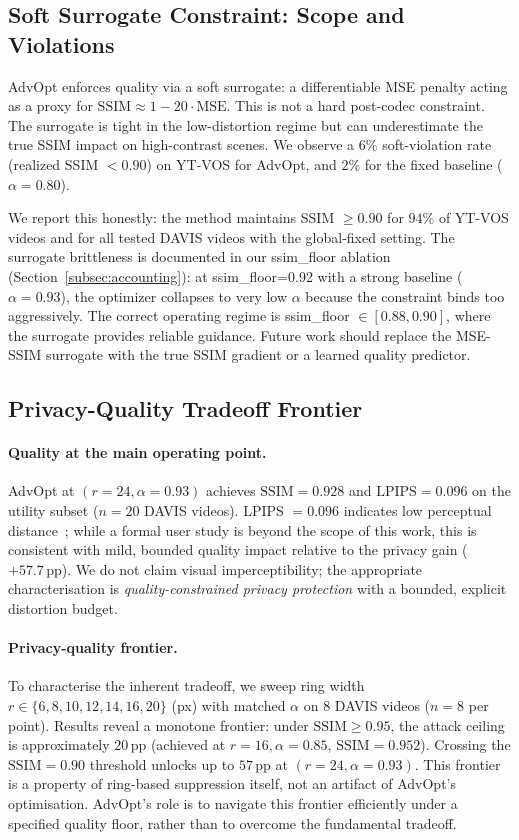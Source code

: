 \subsection{Soft Surrogate Constraint: Scope and Violations}

AdvOpt enforces quality via a soft surrogate: a differentiable MSE penalty acting as a proxy for $\mathrm{SSIM} \approx 1 - 20 \cdot \mathrm{MSE}$.
This is not a hard post-codec constraint. The surrogate is tight in the low-distortion regime but can underestimate the true SSIM impact on high-contrast scenes.
We observe a $6\%$ soft-violation rate (realized SSIM $< 0.90$) on YT-VOS for AdvOpt, and $2\%$ for the fixed baseline ($\alpha=0.80$).

We report this honestly: the method maintains SSIM $\geq 0.90$ for $94\%$ of YT-VOS videos and for all tested DAVIS videos with the global-fixed setting.
The surrogate brittleness is documented in our ssim\_floor ablation (Section~\ref{subsec:accounting}): at ssim\_floor=0.92 with a strong baseline ($\alpha=0.93$), the optimizer collapses to very low $\alpha$ because the constraint binds too aggressively.
The correct operating regime is ssim\_floor $\in [0.88, 0.90]$, where the surrogate provides reliable guidance.
Future work should replace the MSE-SSIM surrogate with the true SSIM gradient or a learned quality predictor.

\subsection{Privacy-Quality Tradeoff Frontier}

\paragraph{Quality at the main operating point.}
AdvOpt at $(r{=}24,\alpha{=}0.93)$ achieves $\mathrm{SSIM}{=}0.928$ and $\mathrm{LPIPS}{=}0.096$ on the utility subset ($n{=}20$ DAVIS videos).
LPIPS $= 0.096$ indicates low perceptual distance~\cite{zhang2018lpips}; while a formal user study is beyond the scope of this work, this is consistent with mild, bounded quality impact relative to the privacy gain ($+57.7\,\mathrm{pp}$).
We do not claim visual imperceptibility; the appropriate characterisation is \emph{quality-constrained privacy protection} with a bounded, explicit distortion budget.

\paragraph{Privacy-quality frontier.}
To characterise the inherent tradeoff, we sweep ring width $r \in \{6,8,10,12,14,16,20\}$ (px) with matched $\alpha$ on 8 DAVIS videos ($n=8$ per point).
Results reveal a monotone frontier: under $\mathrm{SSIM}{\geq}0.95$, the attack ceiling is approximately $20\,\mathrm{pp}$ (achieved at $r{=}16, \alpha{=}0.85$, $\mathrm{SSIM}{=}0.952$).
Crossing the $\mathrm{SSIM}{=}0.90$ threshold unlocks up to $57\,\mathrm{pp}$ at $(r{=}24, \alpha{=}0.93)$.
This frontier is a property of ring-based suppression itself, not an artifact of AdvOpt's optimisation.
AdvOpt's role is to navigate this frontier efficiently under a specified quality floor, rather than to overcome the fundamental tradeoff.

